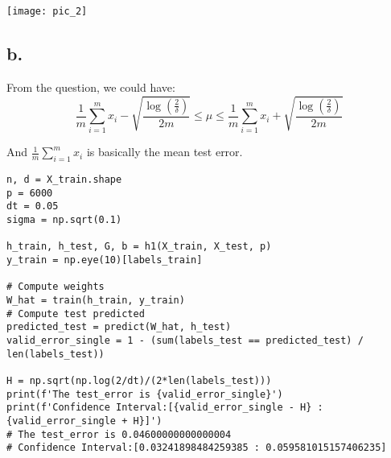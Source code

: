 \documentclass{article}
\begin{document}
\texttt{[image: pic\_2]}





\subsection*{b.}

From the question, we could have:
\[ \frac{1}{m} \sum_{i=1}^{m} x_i -  \sqrt{\frac{\log(\frac{2}{\delta})}{2m}} \le  \mu \le \frac{1}{m} \sum_{i=1}^{m} x_i +  \sqrt{\frac{\log(\frac{2}{\delta})}{2m}}  \]

And $ \frac{1}{m} \sum_{i=1}^{m} x_i$ is basically the mean test error.

\begin{verbatim}
n, d = X_train.shape
p = 6000
dt = 0.05
sigma = np.sqrt(0.1)

h_train, h_test, G, b = h1(X_train, X_test, p)
y_train = np.eye(10)[labels_train]

# Compute weights
W_hat = train(h_train, y_train)
# Compute test predicted
predicted_test = predict(W_hat, h_test)
valid_error_single = 1 - (sum(labels_test == predicted_test) / len(labels_test))

H = np.sqrt(np.log(2/dt)/(2*len(labels_test)))
print(f'The test_error is {valid_error_single}')
print(f'Confidence Interval:[{valid_error_single - H} : {valid_error_single + H}]')
# The test_error is 0.04600000000000004
# Confidence Interval:[0.03241898484259385 : 0.059581015157406235]
\end{verbatim}
\end{document}
